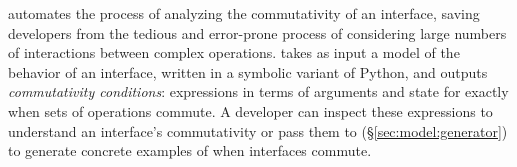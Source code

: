 \analyzer automates the process of analyzing the commutativity of an
interface, saving developers from the tedious and error-prone process of
considering large numbers of interactions between complex operations.
%
\analyzer takes as input a model of the behavior of an interface,
written in a symbolic variant of Python, and outputs \emph{commutativity
  conditions}: expressions in terms of arguments and state for exactly
when sets of operations commute.
%
A developer can inspect these expressions to understand an interface's
commutativity or pass them to \generator (\S\ref{sec:model:generator})
to generate concrete examples of when interfaces commute.



%
%
%

